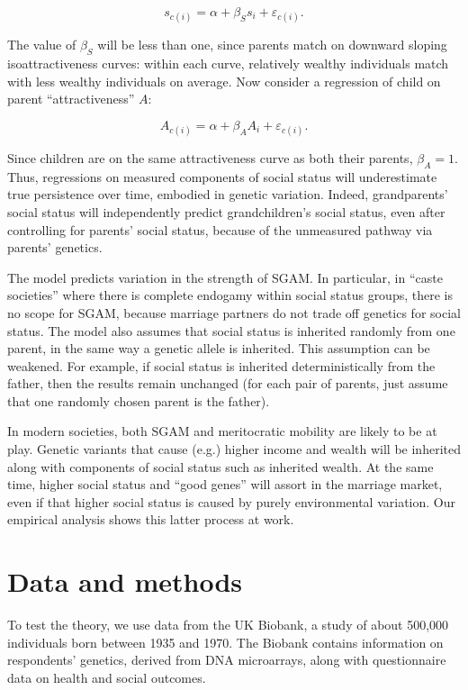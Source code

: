\documentclass[
]{article}
\begin{document}
\[
s_{c(i)} = \alpha + \beta_S s_i + \varepsilon_{c(i)}.
\]

The value of \(\beta_S\) will be less than one, since parents match on
downward sloping isoattractiveness curves: within each curve, relatively
wealthy individuals match with less wealthy individuals on average. Now
consider a regression of child on parent ``attractiveness'' \(A\):

\[
A_{c(i)} = \alpha + \beta_A A_i + \varepsilon_{c(i)}.
\]

Since children are on the same attractiveness curve as both their
parents, \(\beta_A = 1\). Thus, regressions on measured components of
social status will underestimate true persistence over time, embodied in
genetic variation. Indeed, grandparents' social status will
independently predict grandchildren's social status, even after
controlling for parents' social status, because of the unmeasured
pathway via parents' genetics.

The model predicts variation in the strength of SGAM. In particular, in
``caste societies'' where there is complete endogamy within social status
groups, there is no scope for SGAM, because marriage partners do not
trade off genetics for social status. The model also assumes that social
status is inherited randomly from one parent, in the same way a genetic
allele is inherited. This assumption can be weakened. For example, if
social status is inherited deterministically from the father, then the
results remain unchanged (for each pair of parents, just assume that one
randomly chosen parent is the father).

In modern societies, both SGAM and meritocratic mobility are likely to
be at play. Genetic variants that cause (e.g.) higher income and wealth
will be inherited along with components of social status such as
inherited wealth. At the same time, higher social status and ``good
genes'' will assort in the marriage market, even if that higher social
status is caused by purely environmental variation. Our empirical
analysis shows this latter process at work.

\hypertarget{data-and-methods}{%
\section{Data and methods}\label{data-and-methods}}

To test the theory, we use data from the UK Biobank, a study of about
500,000 individuals born between 1935 and 1970. The Biobank contains
information on respondents' genetics, derived from DNA microarrays,
along with questionnaire data on health and social outcomes.
\end{document}
